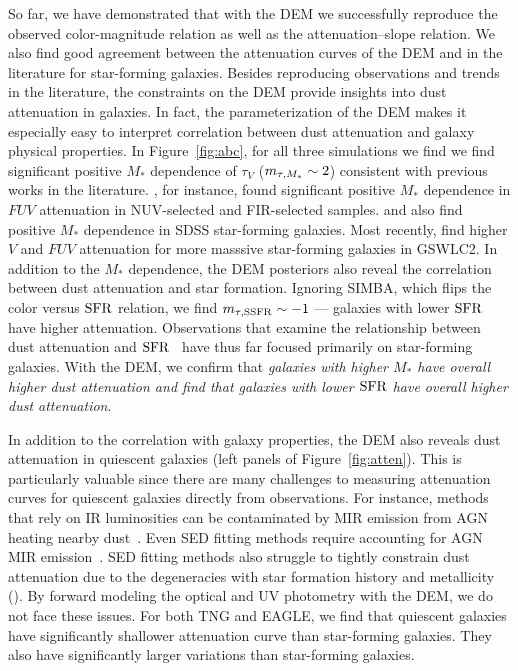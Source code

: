 So far, we have demonstrated that with the DEM we successfully reproduce the 
observed color-magnitude relation as well as the attenuation--slope relation.
We also find good agreement between the attenuation curves of the DEM and in
the literature for star-forming galaxies. Besides reproducing observations and
trends in the literature, the constraints on the DEM provide insights into dust
attenuation in galaxies. In fact, the parameterization of the DEM makes it
especially easy to interpret correlation between dust attenuation and galaxy
physical properties. In Figure~\ref{fig:abc}, for all three simulations we find
we find significant positive $M_*$ dependence of $\tau_V$ ($m_{\tau,M_*} \sim 2$) 
consistent with previous works in the literature. \cite{burgarella2005}, for instance, found significant
positive $M_*$ dependence in $FUV$ attenuation in NUV-selected and FIR-selected
samples. \cite{garn2010} and \cite{battisti2016} also find positive $M_*$ 
dependence in SDSS star-forming galaxies. Most recently, \cite{salim2018} 
find higher $V$ and $FUV$ attenuation for more masssive star-forming galaxies
in GSWLC2. In addition to the $M_*$ dependence, the DEM posteriors also reveal the
correlation between dust attenuation and star formation. Ignoring SIMBA, which
flips the color versus ${\rm SFR}$ relation, we find $m_{\tau,{\rm SSFR}}\sim-1$ --- galaxies 
with lower ${\rm SFR}$ have higher attenuation. Observations that examine the
relationship between dust attenuation and ${\rm SFR}$~\citep[\eg][]{garn2010,
reddy2015, battisti2016, battisti2017, salim2018} have thus far focused
primarily on star-forming galaxies. With the DEM, we confirm that 
\emph{galaxies with higher $M_*$ have overall higher dust attenuation
and find that galaxies with lower ${\rm SFR}$ have overall higher dust attenuation}. 


In addition to the correlation with galaxy properties, the DEM also reveals
dust attenuation in quiescent galaxies (left panels of Figure~\ref{fig:atten}). 
This is particularly valuable since there are many challenges to measuring
attenuation curves for quiescent galaxies directly from observations. For
instance, methods that rely on IR luminosities can be contaminated by MIR 
emission from AGN heating nearby dust~\cite{kirkpatrick2015}. Even SED 
fitting methods require accounting for AGN MIR emission~\citep{salim2016,
leja2018, salim2018}. SED fitting methods also struggle to tightly constrain
dust attenuation due to the degeneracies with star formation history and 
metallicity (). By forward modeling the optical and UV photometry
with the DEM, we do not face these issues. For both TNG and EAGLE, we find 
that quiescent galaxies have significantly shallower attenuation curve than
star-forming galaxies. They also have significantly larger variations than
star-forming galaxies. %

